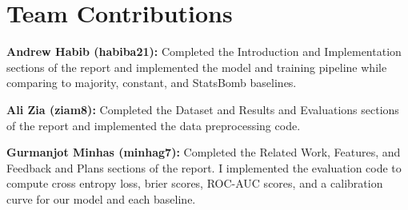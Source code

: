 \documentclass[11pt]{article}
\begin{document}
\section*{Team Contributions}

\textbf{Andrew Habib (habiba21):} Completed the Introduction and Implementation sections of the report and implemented the model and training pipeline while comparing to majority, constant, and StatsBomb baselines.

\vspace{0.5em}
\noindent \textbf{Ali Zia (ziam8):} Completed the Dataset and Results and Evaluations sections of the report and implemented the data preprocessing code.

\vspace{0.5em}
\noindent \textbf{Gurmanjot Minhas (minhag7):} Completed the Related Work, Features, and Feedback and Plans sections of the report. I implemented the evaluation code to compute cross entropy loss, brier scores, ROC-AUC scores, and a calibration curve for our model and each baseline.

%





\end{document}
